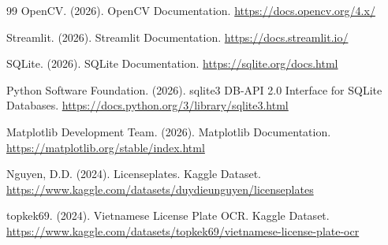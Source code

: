 \documentclass[13pt,a4paper]{report}
\begin{document}
\begin{thebibliography}{99}
	OpenCV. (2026). OpenCV Documentation. \url{https://docs.opencv.org/4.x/}
	
	Streamlit. (2026). Streamlit Documentation. \url{https://docs.streamlit.io/}
	
	SQLite. (2026). SQLite Documentation. \url{https://sqlite.org/docs.html}
	
	Python Software Foundation. (2026). sqlite3 DB-API 2.0 Interface for SQLite Databases. \url{https://docs.python.org/3/library/sqlite3.html}
	
	Matplotlib Development Team. (2026). Matplotlib Documentation. \url{https://matplotlib.org/stable/index.html}
	
	Nguyen, D.D. (2024). Licenseplates. Kaggle Dataset. \url{https://www.kaggle.com/datasets/duydieunguyen/licenseplates}
	
	topkek69. (2024). Vietnamese License Plate OCR. Kaggle Dataset. \url{https://www.kaggle.com/datasets/topkek69/vietnamese-license-plate-ocr}
\end{thebibliography}
\end{document}
